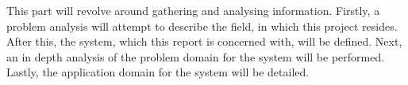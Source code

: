 This part will revolve around gathering and analysing information. 
Firstly, a problem analysis will attempt to describe the field, in which this project resides.
After this, the system, which this report is concerned with, will be defined.
Next, an in depth analysis of the problem domain for the system will be performed.
Lastly, the application domain for the system will be detailed.
